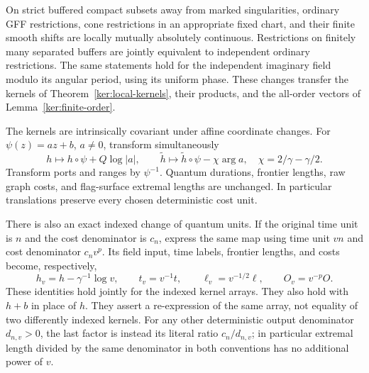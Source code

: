 \begin{proposition}\label{ker:field-transfer}
On strict buffered compact subsets away from marked singularities,
ordinary GFF restrictions, cone restrictions in an appropriate fixed
chart, and their finite smooth shifts are locally mutually absolutely
continuous.  Restrictions on finitely many separated buffers are
jointly equivalent to independent ordinary restrictions.  The same
statements hold for the independent imaginary field modulo its
angular period, using its uniform phase.  These changes transfer the
kernels of Theorem~\ref{ker:local-kernels}, their products, and the
all-order vectors of Lemma~\ref{ker:finite-order}.

The kernels are intrinsically covariant under affine coordinate
changes.  For \(\psi(z)=az+b\), \(a\ne0\), transform simultaneously
\[
 h\longmapsto h\circ\psi+Q\log|a|,\qquad
 \widetilde h\longmapsto\widetilde h\circ\psi-\chi\arg a,
 \quad \chi=2/\gamma-\gamma/2.
\]
Transform ports and ranges by \(\psi^{-1}\).  Quantum durations,
frontier lengths, raw graph costs, and flag-surface extremal lengths
are unchanged.  In particular translations preserve every chosen
deterministic cost unit.

There is also an exact indexed change of quantum units.  If the
original time unit is \(n\) and the cost denominator is \(c_n\),
express the same map using time unit \(vn\) and cost denominator
\(c_nv^p\).  Its field input, time labels, frontier lengths, and costs
become, respectively,
\begin{equation}\label{ker:units}
 h_v=h-\gamma^{-1}\log v,\qquad
 t_v=v^{-1}t,\qquad \ell_v=v^{-1/2}\ell,
 \qquad O_v=v^{-p}O.
\end{equation}
These identities hold jointly for the indexed kernel arrays.  They
also hold with \(h+b\) in place of \(h\).  They assert a re-expression
of the same array, not equality of two differently indexed kernels.
For any other deterministic output denominator \(d_{n,v}>0\), the
last factor is instead its literal ratio \(c_n/d_{n,v}\); in
particular extremal length divided by the same denominator in both
conventions has no additional power of \(v\).
\end{proposition}

